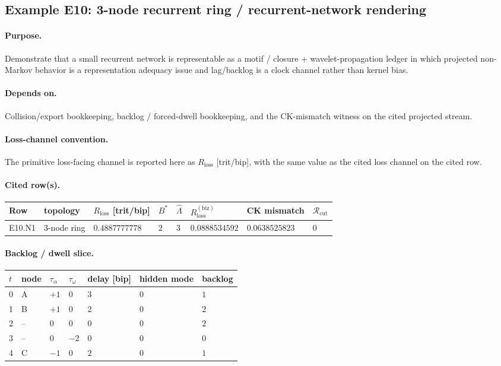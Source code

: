 \subsection{Example E10: 3-node recurrent ring / recurrent-network rendering}\label{app:e10-neural}
\paragraph{Purpose.} Demonstrate that a small recurrent network is representable as a motif / closure + wavelet-propagation ledger in which projected non-Markov behavior is a representation adequacy issue and lag/backlog is a clock channel rather than kernel bias.
\paragraph{Depends on.} Collision/export bookkeeping, backlog / forced-dwell bookkeeping, and the CK-mismatch witness on the cited projected stream.
\paragraph{Loss-channel convention.} The primitive loss-facing channel is reported here as $R_{\mathrm{loss}}$ [trit/bip], with the same value as the cited loss channel on the cited row.
\paragraph{Cited row(s).}
{\footnotesize
\begin{center}
\begin{tabular}{@{}llllllll@{}}
\toprule
Row & topology & $R_{\mathrm{loss}}$ [trit/bip] & $B^*$ & $\widehat\Lambda$ & $R_{\mathrm{loss}}^{(\mathrm{biz})}$ & CK mismatch & $\mathcal R_{\mathrm{cut}}$ \\
\midrule
E10.N1 & 3-node ring & $0.4887777778$ & $2$ & $3$ & $0.0888534592$ & $0.0638525823$ & $0$ \\
\bottomrule
\end{tabular}
\end{center}}
\paragraph{Backlog / dwell slice.}
{\footnotesize
\begin{center}
\begin{tabular}{@{}lllllll@{}}
\toprule
$t$ & node & $\tau_\alpha$ & $\tau_\omega$ & delay [bip] & hidden mode & backlog \\
\midrule
0 & A & $+1$ & $0$ & $3$ & $0$ & $1$ \\
1 & B & $+1$ & $0$ & $2$ & $0$ & $2$ \\
2 & -- & $0$ & $0$ & $0$ & $0$ & $2$ \\
3 & -- & $0$ & $-2$ & $0$ & $0$ & $0$ \\
4 & C & $-1$ & $0$ & $2$ & $0$ & $1$ \\
\bottomrule
\end{tabular}
\end{center}}
